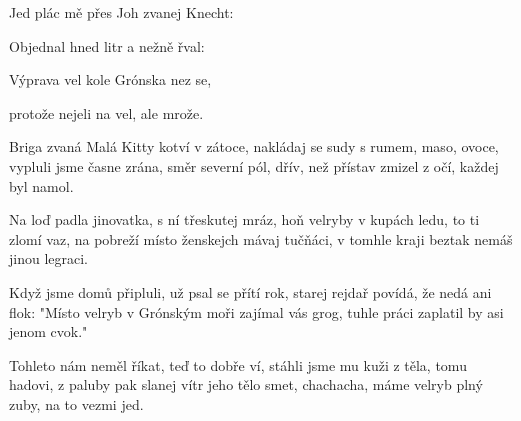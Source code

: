 

\zs
Jed plác mě přes  Joh zvanej Knecht: 

 

Objednal hned litr  a  nežně řval: 

 
\ks

\zr
Výprava vel kole Grónska nez se,

protože nejeli  na vel, ale  mrože. 
\kr

\zs
Briga zvaná Malá Kitty kotví v zátoce,
nakládaj se sudy s rumem, maso, ovoce,
vypluli jsme časne zrána, směr severní pól,
dřív, než přístav zmizel z očí, každej byl namol.
\ks

\zr  \kr

\zs
Na loď padla jinovatka, s ní třeskutej mráz,
hoň velryby v kupách ledu, to ti zlomí vaz,
na pobreží místo ženskejch mávaj tučňáci,
v tomhle kraji beztak nemáš jinou legraci.
\ks

\zr  \kr

\zs
Když jsme domů připluli, už psal se přítí rok,
starej rejdař povídá, že nedá ani flok:
"Místo velryb v Grónským moři zajímal vás grog,
tuhle práci zaplatil by asi jenom cvok."
\ks

\zr  \kr

\zs
Tohleto nám neměl říkat, teď to dobře ví,
stáhli jsme mu kuži z těla, tomu hadovi,
z paluby pak slanej vítr jeho tělo smet, chachacha,
máme velryb plný zuby, na to vezmi jed.
\ks

\zr  \kr

\kp






















